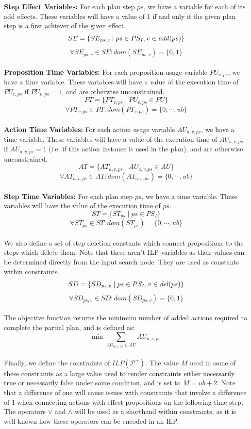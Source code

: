 \textbf{Step Effect Variables:} For each plan step $ps$, we have a variable for each of its add effects. These variables will have a value of 1 if and only if the given plan step is a first achiever of the given effect.
\[SE=\{SE_{ps,v} \mid ps \in PS_I, v\in \mathit{add}(ps)\}\]
\[\forall SE_{ps,v}\in SE: \mathit{dom}(SE_{ps,v})=\{0,1\}\]\\


\textbf{Proposition Time Variables:} For each proposition usage variable $PU_{v,ps}$, we have a time variable. These variables will have a value of the execution time of  $PU_{v,ps}$ if  $PU_{v,ps}=1$, and are otherwise unconstrained.
\[PT=\{PT_{v,ps} \mid  PU_{v,ps}\in PU\}\]
\[\forall PT_{v,ps}\in PT: \mathit{dom}(PT_{v,ps})=\{0,\cdots,\mathit{ub}\}\]\\


\textbf{Action Time Variables:} For each action usage variable $AU_{a,v,ps}$, we have a time variable. These variables will have a value of the execution time of $AU_{a,v,ps}$ if $AU_{a,v,ps}=1$ (i.e. if this action instance is used in the plan), and are otherwise unconstrained.
\[AT=\{AT_{a,v,ps} \mid  AU_{a,v,ps}\in AU\}\]
\[\forall AT_{a,v,ps}\in AT: \mathit{dom}(AT_{a,v,ps})=\{0,\cdots,\mathit{ub}\}\]\\


\textbf{Step Time Variables:} For each plan step $ps$, we have a time variable. These variables will have the value of the execution time of $ps$.
\[ST=\{ST_{ps} \mid ps \in PS_I\}\]
\[\forall ST_{ps}\in ST: \mathit{dom}(ST_{ps})=\{0,\cdots,\mathit{ub}\}\]\\


We also define a set of step deletion constants which connect propositions to the steps which delete them. Note that these aren't ILP variables as their values can be determined directly from the input search node. They are used as constants within constraints.
\[SD=\{SD_{ps,v}\mid ps\in PS_I,v\in \mathit{del} (ps)\}\]
\[\forall SD_{ps,v}\in SD: \mathit{dom}(SD_{ps,v})=\{0,1\}\]\\


The objective function returns the minimum number of added actions required to complete the partial plan, and is defined as: \[\text{min }\sum_{AU_{a,v,ps}\in AU} AU_{a,v,ps}\]\\


Finally, we define the constraints of $\mathit{ILP}(\mathcal{P}^+)$. The value $M$ used in some of these constraints as a large value used to render constraints either necessarily true or necessarily false under some condition, and is set to $M=ub+2$. Note that a difference of one will cause issues with constraints that involve a difference of 1 when connecting actions with effect propositions on the following time step. The operators $\vee$ and $\wedge$ will be used as a shorthand within constraints, as it is well known how these operators can be encoded in an ILP.\\



